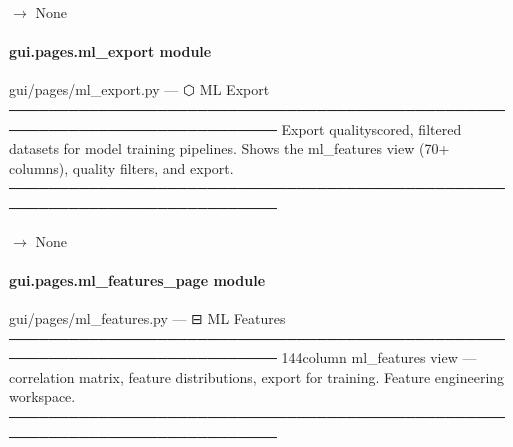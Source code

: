 \documentclass[letterpaper,10pt,english]{sphinxmanual}
\begin{document}
\begin{fulllineitems}
\label{\detokenize{gui.pages.llm_log:gui.pages.llm_log.render}}
\pysigstartsignatures
\pysiglinewithargsret
{}
{}
{{ $\rightarrow$ None}}
\pysigstopsignatures
\end{fulllineitems}


\sphinxstepscope


\paragraph{gui.pages.ml\_export module}
\label{\detokenize{gui.pages.ml_export:module-gui.pages.ml_export}}\label{\detokenize{gui.pages.ml_export:gui-pages-ml-export-module}}\label{\detokenize{gui.pages.ml_export::doc}}
\sphinxAtStartPar
gui/pages/ml\_export.py  —  ⬡  ML Export
─────────────────────────────────────────────────────────────────────────────
Export quality\sphinxhyphen{}scored, filtered datasets for model training pipelines.
Shows the ml\_features view (70+ columns), quality filters, and export.
─────────────────────────────────────────────────────────────────────────────

\begin{fulllineitems}
\label{\detokenize{gui.pages.ml_export:gui.pages.ml_export.render}}
\pysigstartsignatures
\pysiglinewithargsret
{}
{}
{{ $\rightarrow$ None}}
\pysigstopsignatures
\end{fulllineitems}


\sphinxstepscope


\paragraph{gui.pages.ml\_features\_page module}
\label{\detokenize{gui.pages.ml_features_page:module-gui.pages.ml_features_page}}\label{\detokenize{gui.pages.ml_features_page:gui-pages-ml-features-page-module}}\label{\detokenize{gui.pages.ml_features_page::doc}}
\sphinxAtStartPar
gui/pages/ml\_features.py  —  ⊟  ML Features
─────────────────────────────────────────────────────────────────────────────
144\sphinxhyphen{}column ml\_features view — correlation matrix, feature distributions,
export for training. Feature engineering workspace.
─────────────────────────────────────────────────────────────────────────────
\end{document}

